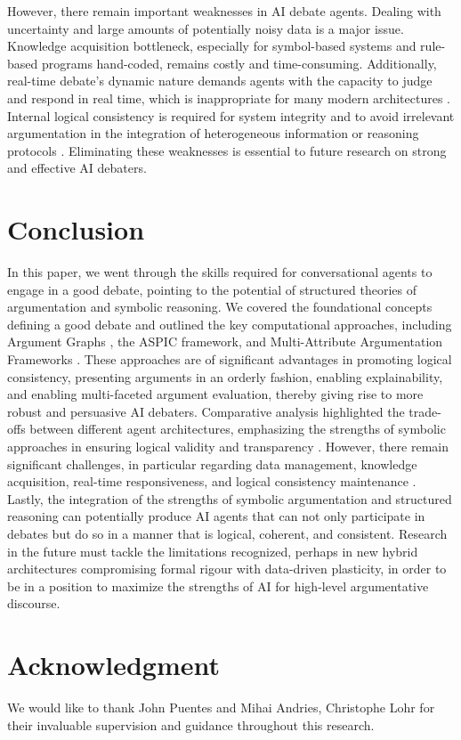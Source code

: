 \documentclass[conference]{IEEEtran}
\begin{document}
However, there remain important weaknesses in AI debate agents. Dealing with uncertainty and large amounts of potentially noisy data is a major issue. Knowledge acquisition bottleneck, especially for symbol-based systems and rule-based programs hand-coded, remains costly and time-consuming. Additionally, real-time debate's dynamic nature demands agents with the capacity to judge and respond in real time, which is inappropriate for many modern architectures \cite{kasif2024trilogy}. Internal logical consistency is required for system integrity and to avoid irrelevant argumentation in the integration of heterogeneous information or reasoning protocols \cite{ilkou2020symbolic}. Eliminating these weaknesses is essential to future research on strong and effective AI debaters.

\section{Conclusion}
In this paper, we went through the skills required for conversational agents to engage in a good debate, pointing to the potential of structured theories of argumentation and symbolic reasoning. We covered the foundational concepts defining a good debate \cite{rakshit2019debbie} \cite{tan2016winning} \cite{shuster2025judging} and outlined the key computational approaches, including Argument Graphs \cite{chalaguine2020persuasive}, the ASPIC framework, and Multi-Attribute Argumentation Frameworks \cite{engelmann2022argumentation}. These approaches are of significant advantages in promoting logical consistency, presenting arguments in an orderly fashion, enabling explainability, and enabling multi-faceted argument evaluation, thereby giving rise to more robust and persuasive AI debaters.
Comparative analysis highlighted the trade-offs between different agent architectures, emphasizing the strengths of symbolic approaches in ensuring logical validity and transparency \cite{kasif2024trilogy}. However, there remain significant challenges, in particular regarding data management, knowledge acquisition, real-time responsiveness, and logical consistency maintenance \cite{ilkou2020symbolic} \cite{kasif2024trilogy}.
Lastly, the integration of the strengths of symbolic argumentation and structured reasoning can potentially produce AI agents that can not only participate in debates but do so in a manner that is logical, coherent, and consistent. Research in the future must tackle the limitations recognized, perhaps in new hybrid architectures compromising formal rigour with data-driven plasticity, in order to be in a position to maximize the strengths of AI for high-level argumentative discourse.

\section*{Acknowledgment}
We would like to thank John Puentes and Mihai Andries, Christophe Lohr for their invaluable supervision and guidance throughout this research.

\printbibliography
    
\end{document}
